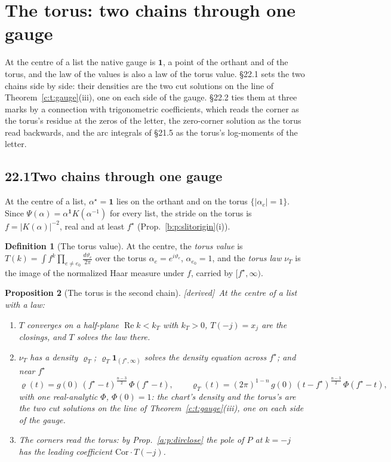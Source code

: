 \documentclass[11pt]{article}
\newcommand{\one}{\mathbf 1}
\theoremstyle{plain}
\newtheorem{proposition}{Proposition}[section]
\theoremstyle{definition}
\newtheorem{definition}[proposition]{Definition}
\theoremstyle{remark}
\renewcommand{\thesection}{15}
\renewcommand{\theproposition}{15.\arabic{proposition}}
\newcommand{\derived}{\textup{[derived]}}
\begin{document}
\renewcommand{\thesection}{22}
\setcounter{proposition}{0}
\renewcommand{\theproposition}{22.\arabic{proposition}}

\section{The torus: two chains through one gauge}

At the centre of a list the native gauge is $\one$, a point of the orthant and of the torus, and the law of the values is also a law of the torus value. \S22.1 sets the two chains side by side: their densities are the two cut solutions on the line of Theorem~\ref{c:t:gauge}(iii), one on each side of the gauge. \S22.2 ties them at three marks by a connection with trigonometric coefficients, which reads the corner as the torus's residue at the zeros of the letter, the zero-corner solution as the torus read backwards, and the arc integrals of \S21.5 as the torus's log-moments of the letter.

\subsection*{22.1\quad Two chains through one gauge}

At the centre of a list, $\alpha^\star=\one$ lies on the orthant and on the torus $\{|\alpha_e|=1\}$. Since $\Psi(\alpha)=\alpha^{\one}K(\alpha^{-1})$ for every list, the stride on the torus is $f=|K(\alpha)|^{-2}$, real and at least $f^\star$ (Prop.~\ref{b:p:slitorigin}(i)).

\begin{definition}[The torus value]\label{d:d:torus}
At the centre, the \emph{torus value} is $T(k)=\int f^k\prod_{e\neq e_0}\frac{d\vartheta_e}{2\pi}$ over the torus $\alpha_e=e^{i\vartheta_e}$, $\alpha_{e_0}=1$, and the \emph{torus law} $\nu_T$ is the image of the normalized Haar measure under $f$, carried by $[f^\star,\infty)$.
\end{definition}

\begin{proposition}[The torus is the second chain]\label{d:p:torus}\derived\
At the centre of a list with a law:
\begin{enumerate}[label=(\roman*)]
\item $T$ converges on a half-plane $\operatorname{Re}k<k_T$ with $k_T>0$, $T(-j)=x_j$ are the closings, and $T$ solves the law there.
\item $\nu_T$ has a density $\varrho_T$; $\varrho_T\one_{(f^\star,\infty)}$ solves the density equation across $f^\star$; and near $f^\star$
\[
\varrho(t)=g(0)\,(f^\star-t)^{\frac{n-3}2}\,\Phi(f^\star-t),\qquad \varrho_T(t)=(2\pi)^{1-n}\,g(0)\,(t-f^\star)^{\frac{n-3}2}\,\Phi(f^\star-t),
\]
with one real-analytic $\Phi$, $\Phi(0)=1$: the chart's density and the torus's are the two cut solutions on the line of Theorem~\ref{c:t:gauge}(iii), one on each side of the gauge.
\item The corners read the torus: by Prop.~\ref{a:p:dirclose} the pole of $P$ at $k=-j$ has the leading coefficient $\mathrm{Cor}\cdot T(-j)$.
\end{enumerate}
\end{proposition}
\end{document}
